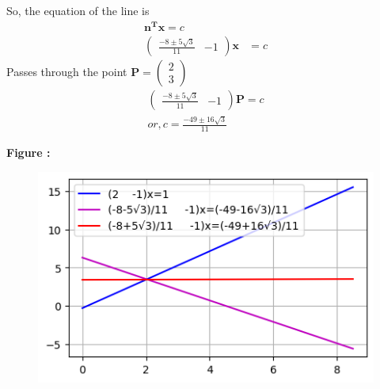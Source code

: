 \documentclass[12pt]{article}
\let\vec\mathbf
\begin{document}
So, the equation of the line is
\begin{align}
\vec{n^Tx}=c\\
\begin{pmatrix}
    \frac{-8\pm5\sqrt{3}}{11}&-1
\end{pmatrix}\vec{x}&=c
\end{align}
Passes through the point $\vec{P}=\begin{pmatrix}
    2\\3
\end{pmatrix}$
\begin{align}
\begin{pmatrix}
    \frac{-8\pm5\sqrt{3}}{11}&-1
\end{pmatrix}\vec{P}=c\\
 or,c=\frac{-49\pm16\sqrt{3}}{11}
\end{align}

\textbf{Figure :}
\begin{figure}[H]
    \centering
    \includegraphics[width=\columnwidth]{fig/asgnt1.png}
    \caption{}
    \label{fig:fig:1}
\end{figure}
\end{document}

